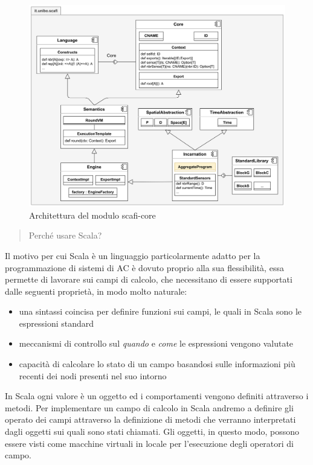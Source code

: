 \documentclass[12pt,a4paper,openright,twoside]{book}
\begin{document}
\begin{figure}
    \centering
    \includegraphics[width=.9\linewidth]{figures/core-arc.png}
    \caption{Architettura del modulo scafi-core}
    \label{fig:core-arc}
\end{figure}

\begin{quote}
    \centering
    Perché usare Scala?
\end{quote}

Il motivo per cui Scala è un linguaggio particolarmente adatto per la programmazione di sistemi di \ac{AC} è dovuto proprio alla sua flessibilità, essa permette di lavorare sui campi di calcolo, che necessitano di essere supportati dalle seguenti proprietà, in modo molto naturale:

\begin{itemize}
    \item una sintassi coincisa per definire funzioni sui campi, le quali in Scala sono le espressioni standard
    \item meccanismi di controllo sul \textit{quando} e \textit{come} le espressioni vengono valutate
    \item capacità di calcolare lo stato di un campo basandosi sulle informazioni più recenti dei nodi presenti nel suo intorno
\end{itemize}

In Scala ogni valore è un oggetto ed i comportamenti vengono definiti attraverso i metodi. Per implementare un campo di calcolo in Scala andremo a definire gli operato dei campi attraverso la definizione di metodi che verranno interpretati dagli oggetti sui quali sono stati chiamati. Gli oggetti, in questo modo, possono essere visti come macchine virtuali in locale per l'esecuzione degli operatori di campo.
\end{document}
